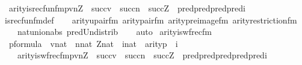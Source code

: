 \begin{isabellebody}
\ \ arity{\isacharparenleft}{\kern0pt}is{\isacharunderscore}{\kern0pt}recfun{\isacharunderscore}{\kern0pt}fm{\isacharparenleft}{\kern0pt}p{\isacharcomma}{\kern0pt}v{\isacharcomma}{\kern0pt}n{\isacharcomma}{\kern0pt}Z{\isacharparenright}{\kern0pt}{\isacharparenright}{\kern0pt}\ {\isacharequal}{\kern0pt}\ succ{\isacharparenleft}{\kern0pt}v{\isacharparenright}{\kern0pt}\ {\isasymunion}\ succ{\isacharparenleft}{\kern0pt}n{\isacharparenright}{\kern0pt}\ {\isasymunion}\ succ{\isacharparenleft}{\kern0pt}Z{\isacharparenright}{\kern0pt}\ {\isasymunion}\ pred{\isacharparenleft}{\kern0pt}pred{\isacharparenleft}{\kern0pt}pred{\isacharparenleft}{\kern0pt}pred{\isacharparenleft}{\kern0pt}i{\isacharparenright}{\kern0pt}{\isacharparenright}{\kern0pt}{\isacharparenright}{\kern0pt}{\isacharparenright}{\kern0pt}{\isachardoublequoteclose}\isanewline
%
\isadelimproof
\ \ %
\endisadelimproof
%
\isatagproof
{}\isamarkupfalse%
\ is{\isacharunderscore}{\kern0pt}recfun{\isacharunderscore}{\kern0pt}fm{\isacharunderscore}{\kern0pt}def\isanewline
\ \ \isamarkupfalse%
\ arity{\isacharunderscore}{\kern0pt}upair{\isacharunderscore}{\kern0pt}fm\ arity{\isacharunderscore}{\kern0pt}pair{\isacharunderscore}{\kern0pt}fm\ arity{\isacharunderscore}{\kern0pt}pre{\isacharunderscore}{\kern0pt}image{\isacharunderscore}{\kern0pt}fm\ arity{\isacharunderscore}{\kern0pt}restriction{\isacharunderscore}{\kern0pt}fm\isanewline
\ \ \ \ nat{\isacharunderscore}{\kern0pt}union{\isacharunderscore}{\kern0pt}abs{}\ pred{\isacharunderscore}{\kern0pt}Un{\isacharunderscore}{\kern0pt}distrib\isanewline
\ \ \isamarkupfalse%
\ auto%
\endisatagproof
{\isafoldproof}%
%
\isadelimproof
\isanewline
%
\endisadelimproof
\isanewline
{}\isamarkupfalse%
\ arity{\isacharunderscore}{\kern0pt}is{\isacharunderscore}{\kern0pt}wfrec{\isacharunderscore}{\kern0pt}fm\ {\isacharcolon}{\kern0pt}\isanewline
\ \ {\isachardoublequoteopen}{\isasymlbrakk}p{\isasymin}formula\ {\isacharsemicolon}{\kern0pt}\ v{\isasymin}nat\ {\isacharsemicolon}{\kern0pt}\ n{\isasymin}nat{\isacharsemicolon}{\kern0pt}\ Z{\isasymin}nat\ {\isacharsemicolon}{\kern0pt}\ i{\isasymin}nat{\isasymrbrakk}\ {\isasymLongrightarrow}\ arity{\isacharparenleft}{\kern0pt}p{\isacharparenright}{\kern0pt}\ {\isacharequal}{\kern0pt}\ i\ {\isasymLongrightarrow}\ \isanewline
\ \ \ \ arity{\isacharparenleft}{\kern0pt}is{\isacharunderscore}{\kern0pt}wfrec{\isacharunderscore}{\kern0pt}fm{\isacharparenleft}{\kern0pt}p{\isacharcomma}{\kern0pt}v{\isacharcomma}{\kern0pt}n{\isacharcomma}{\kern0pt}Z{\isacharparenright}{\kern0pt}{\isacharparenright}{\kern0pt}\ {\isacharequal}{\kern0pt}\ succ{\isacharparenleft}{\kern0pt}v{\isacharparenright}{\kern0pt}\ {\isasymunion}\ succ{\isacharparenleft}{\kern0pt}n{\isacharparenright}{\kern0pt}\ {\isasymunion}\ succ{\isacharparenleft}{\kern0pt}Z{\isacharparenright}{\kern0pt}\ {\isasymunion}\ pred{\isacharparenleft}{\kern0pt}pred{\isacharparenleft}{\kern0pt}pred{\isacharparenleft}{\kern0pt}pred{\isacharparenleft}{\kern0pt}pred{\isacharparenleft}{\kern0pt}i{\isacharparenright}{\kern0pt}{\isacharparenright}{\kern0pt}{\isacharparenright}{\kern0pt}{\isacharparenright}{\kern0pt}{\isacharparenright}{\kern0pt}{\isachardoublequoteclose}\isanewline

\end{isabellebody}
